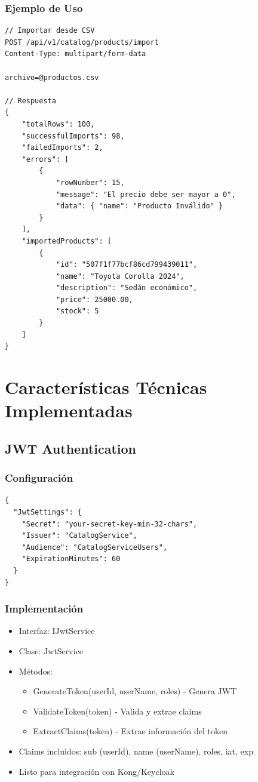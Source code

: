 \documentclass[12pt,a4paper]{article}
\begin{document}
\subsubsection{Ejemplo de Uso}

\begin{lstlisting}
// Importar desde CSV
POST /api/v1/catalog/products/import
Content-Type: multipart/form-data

archivo=@productos.csv

// Respuesta
{
    "totalRows": 100,
    "successfulImports": 98,
    "failedImports": 2,
    "errors": [
        {
            "rowNumber": 15,
            "message": "El precio debe ser mayor a 0",
            "data": { "name": "Producto Inválido" }
        }
    ],
    "importedProducts": [
        {
            "id": "507f1f77bcf86cd799439011",
            "name": "Toyota Corolla 2024",
            "description": "Sedán económico",
            "price": 25000.00,
            "stock": 5
        }
    ]
}
\end{lstlisting}

\section{Características Técnicas Implementadas}

\subsection{JWT Authentication}

\subsubsection{Configuración}

\begin{lstlisting}
{
  "JwtSettings": {
    "Secret": "your-secret-key-min-32-chars",
    "Issuer": "CatalogService",
    "Audience": "CatalogServiceUsers",
    "ExpirationMinutes": 60
  }
}
\end{lstlisting}

\subsubsection{Implementación}

\begin{itemize}
    \item Interfaz: IJwtService
    \item Clase: JwtService
    \item Métodos:
    \begin{itemize}
        \item GenerateToken(userId, userName, roles) - Genera JWT
        \item ValidateToken(token) - Valida y extrae claims
        \item ExtractClaims(token) - Extrae información del token
    \end{itemize}
    \item Claims incluidos: sub (userId), name (userName), roles, iat, exp
    \item Listo para integración con Kong/Keycloak
\end{itemize}
\end{document}
